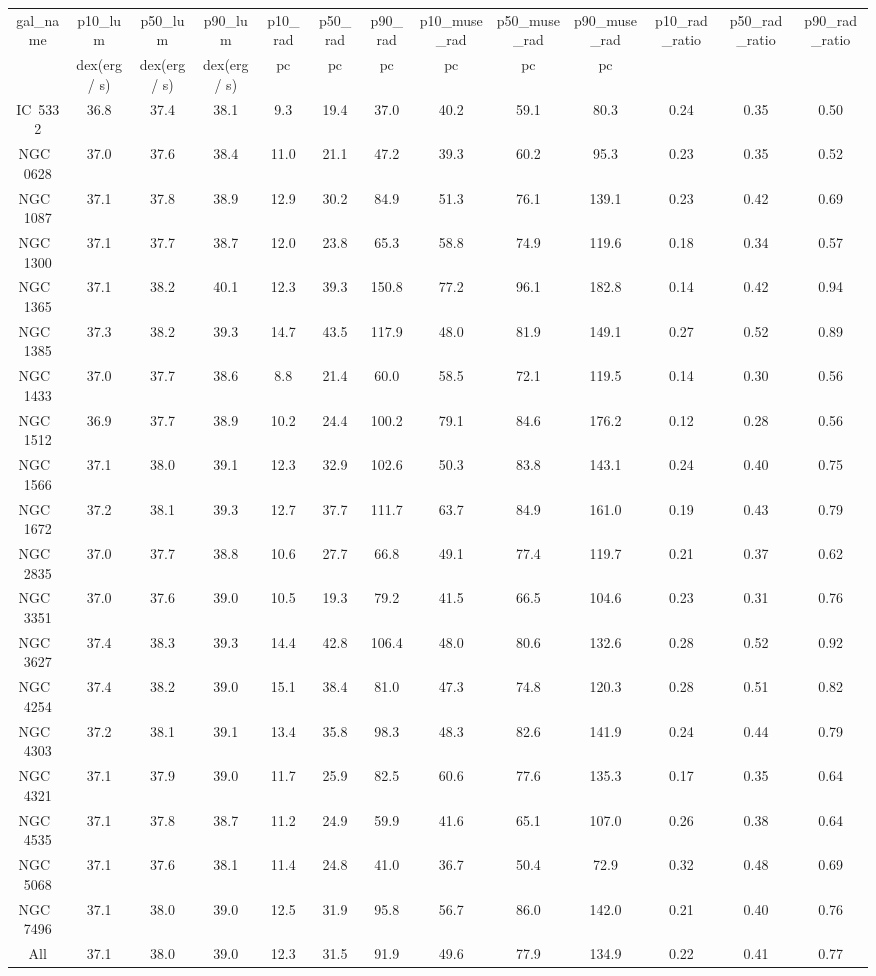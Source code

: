 \begin{table}
\begin{tabular}{ccccccccccccc}
gal_name & p10_lum & p50_lum & p90_lum & p10_rad & p50_rad & p90_rad & p10_muse_rad & p50_muse_rad & p90_muse_rad & p10_rad_ratio & p50_rad_ratio & p90_rad_ratio \\
 & dex(erg / s) & dex(erg / s) & dex(erg / s) & $\mathrm{pc}$ & $\mathrm{pc}$ & $\mathrm{pc}$ & $\mathrm{pc}$ & $\mathrm{pc}$ & $\mathrm{pc}$ & $\mathrm{}$ & $\mathrm{}$ & $\mathrm{}$ \\
IC~5332 & 36.8 & 37.4 & 38.1 & 9.3 & 19.4 & 37.0 & 40.2 & 59.1 & 80.3 & 0.24 & 0.35 & 0.50 \\
NGC~0628 & 37.0 & 37.6 & 38.4 & 11.0 & 21.1 & 47.2 & 39.3 & 60.2 & 95.3 & 0.23 & 0.35 & 0.52 \\
NGC~1087 & 37.1 & 37.8 & 38.9 & 12.9 & 30.2 & 84.9 & 51.3 & 76.1 & 139.1 & 0.23 & 0.42 & 0.69 \\
NGC~1300 & 37.1 & 37.7 & 38.7 & 12.0 & 23.8 & 65.3 & 58.8 & 74.9 & 119.6 & 0.18 & 0.34 & 0.57 \\
NGC~1365 & 37.1 & 38.2 & 40.1 & 12.3 & 39.3 & 150.8 & 77.2 & 96.1 & 182.8 & 0.14 & 0.42 & 0.94 \\
NGC~1385 & 37.3 & 38.2 & 39.3 & 14.7 & 43.5 & 117.9 & 48.0 & 81.9 & 149.1 & 0.27 & 0.52 & 0.89 \\
NGC~1433 & 37.0 & 37.7 & 38.6 & 8.8 & 21.4 & 60.0 & 58.5 & 72.1 & 119.5 & 0.14 & 0.30 & 0.56 \\
NGC~1512 & 36.9 & 37.7 & 38.9 & 10.2 & 24.4 & 100.2 & 79.1 & 84.6 & 176.2 & 0.12 & 0.28 & 0.56 \\
NGC~1566 & 37.1 & 38.0 & 39.1 & 12.3 & 32.9 & 102.6 & 50.3 & 83.8 & 143.1 & 0.24 & 0.40 & 0.75 \\
NGC~1672 & 37.2 & 38.1 & 39.3 & 12.7 & 37.7 & 111.7 & 63.7 & 84.9 & 161.0 & 0.19 & 0.43 & 0.79 \\
NGC~2835 & 37.0 & 37.7 & 38.8 & 10.6 & 27.7 & 66.8 & 49.1 & 77.4 & 119.7 & 0.21 & 0.37 & 0.62 \\
NGC~3351 & 37.0 & 37.6 & 39.0 & 10.5 & 19.3 & 79.2 & 41.5 & 66.5 & 104.6 & 0.23 & 0.31 & 0.76 \\
NGC~3627 & 37.4 & 38.3 & 39.3 & 14.4 & 42.8 & 106.4 & 48.0 & 80.6 & 132.6 & 0.28 & 0.52 & 0.92 \\
NGC~4254 & 37.4 & 38.2 & 39.0 & 15.1 & 38.4 & 81.0 & 47.3 & 74.8 & 120.3 & 0.28 & 0.51 & 0.82 \\
NGC~4303 & 37.2 & 38.1 & 39.1 & 13.4 & 35.8 & 98.3 & 48.3 & 82.6 & 141.9 & 0.24 & 0.44 & 0.79 \\
NGC~4321 & 37.1 & 37.9 & 39.0 & 11.7 & 25.9 & 82.5 & 60.6 & 77.6 & 135.3 & 0.17 & 0.35 & 0.64 \\
NGC~4535 & 37.1 & 37.8 & 38.7 & 11.2 & 24.9 & 59.9 & 41.6 & 65.1 & 107.0 & 0.26 & 0.38 & 0.64 \\
NGC~5068 & 37.1 & 37.6 & 38.1 & 11.4 & 24.8 & 41.0 & 36.7 & 50.4 & 72.9 & 0.32 & 0.48 & 0.69 \\
NGC~7496 & 37.1 & 38.0 & 39.0 & 12.5 & 31.9 & 95.8 & 56.7 & 86.0 & 142.0 & 0.21 & 0.40 & 0.76 \\
All & 37.1 & 38.0 & 39.0 & 12.3 & 31.5 & 91.9 & 49.6 & 77.9 & 134.9 & 0.22 & 0.41 & 0.77 \\
\end{tabular}
\end{table}
